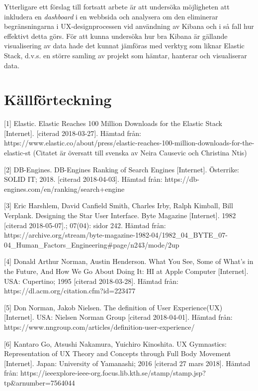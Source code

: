 \documentclass[12pt]{kththesis}
\begin{document}
Ytterligare ett förslag till fortsatt arbete är att undersöka möjligheten att inkludera en \textit{dashboard} i en webbsida och analysera om den eliminerar begränsningarna i UX-designprocessen vid användning av Kibana och i så fall hur effektivt detta görs. För att kunna undersöka hur bra Kibana är gällande visualisering av data hade det kunnat jämföras med verktyg som liknar Elastic Stack, d.v.s. en större samling av projekt som hämtar, hanterar och visualiserar data. 

\chapter{Källförteckning}
[1] Elastic. Elastic Reaches 100 Million Downloads for the Elastic Stack [Internet]. [citerad 2018-03-27]. Hämtad från: https://www.elastic.co/about/press\newline/elastic-reaches-100-million-downloads-for-the-elastic-st (Citatet är översatt till svenska av Neira Causevic och Christina Ntis)

[2] DB-Engines. DB-Engines Ranking of Search Engines [Internet]. Österrike: SOLID IT; 2018. [citerad 2018-04-03]. Hämtad från:\newline  
https://db-engines.com/en/ranking/search+engine  

[3] Eric Harshlem, David Canfield Smith, Charles Irby, Ralph Kimball, Bill Verplank. Designing the Star User Interface. Byte Magazine [Internet]. 1982  [citerad 2018-05-07].; 07(04): sidor 242. Hämtad från: \newline https://archive.org/stream/byte-magazine-1982-04/1982\_04\_BYTE\_07-04\newline\_Human\_Factors\_Engineering\#page/n243/mode/2up    
   
[4] Donald Arthur Norman, Austin Henderson. What You See, Some of What's in the Future, And How We Go About Doing It: HI at Apple Computer [Internet]. USA: Cupertino; 1995 [citerad 2018-03-28]. Hämtad från: https://dl.acm.org/citation.cfm?id=223477

[5] Don Norman, Jakob Nielsen. The definition of User Experience(UX) [Internet]. USA: Nielsen Norman Group [citerad 2018-04-01]. Hämtad från:  https://www.nngroup.com/articles/definition-user-experience/        
                           
[6] Kantaro Go, Atsushi Nakamura, Yuichiro Kinoshita. UX Gymnastics: Representation of UX Theory and Concepts through Full Body Movement [Internet].  Japan: University of Yamanashi; 2016 [citerad 27 mars 2018]. Hämtad från: https://ieeexplore-ieee-org.focus.lib.kth.se\newline/stamp/stamp.jsp?tp\=\&arnumber=7564044
                                           
\end{document}
